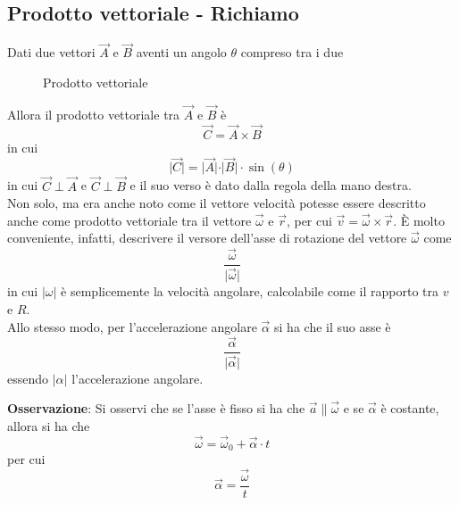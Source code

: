 \documentclass[a4paper]{extarticle}
\begin{document}
\newpage
\noindent
\subsection{Prodotto vettoriale - Richiamo}
Dati due vettori $\vec{A}$ e $\vec{B}$ aventi un angolo $\theta$ compreso tra i due

\begin{figure}[H]
  \centering
  \caption{Prodotto vettoriale}
  \label{fig:prodotto_vettoriale_1}
\end{figure}

\noindent
Allora il prodotto vettoriale tra $\vec A$ e $\vec B$ è
\[\vec C = \vec A \times \vec B\]
in cui
\[\vert \vec C \vert = \vert \vec A \vert \cdot \vert \vec B \vert \cdot \sin(\theta)\]
in cui $\vec C \perp \vec A$ e $\vec C \perp \vec B$ e il suo verso è dato dalla regola della mano destra.\\
Non solo, ma era anche noto come il vettore velocità potesse essere descritto anche come prodotto vettoriale tra il vettore $\vec \omega$ e $\vec r$, per cui $\vec v = \vec \omega \times \vec r$. È molto conveniente, infatti, descrivere il versore dell'asse di rotazione del vettore $\vec \omega$ come
\[\frac{\vec \omega}{\vert \vec \omega \vert}\]
in cui $\vert \omega \vert$ è semplicemente la velocità angolare, calcolabile come il rapporto tra $v$ e $R$.\\
Allo stesso modo, per l'accelerazione angolare $\vec \alpha$ si ha che il suo asse è
\[\frac{\vec \alpha}{\vert \vec \alpha \vert}\]
essendo $\vert \alpha \vert$ l'accelerazione angolare.

\vspace{1em}
\noindent
\textbf{Osservazione}: Si osservi che se l'asse è fisso si ha che $\vec a \parallel \vec \omega$ e se $\vec \alpha$ è costante, allora si ha che
\[\boxed{\vec \omega = \vec \omega_0 + \vec \alpha \cdot t}\]
per cui
\[\boxed{\vec \alpha=\frac{\vec \omega}{t}}\]
\end{document}
